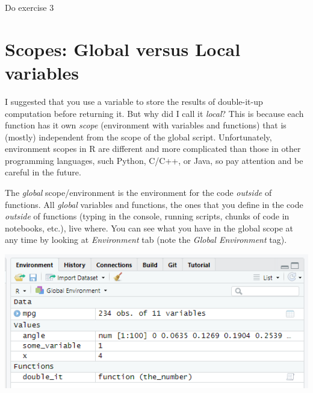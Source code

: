 \documentclass[
]{book}
\begin{document}
Do exercise 3

\hypertarget{scopes-global-versus-local-variables}{%
\section{Scopes: Global versus Local variables}\label{scopes-global-versus-local-variables}}

I suggested that you use a variable to store the results of double-it-up computation before returning it. But why did I call it \emph{local}? This is because each function has it own \emph{scope} (environment with variables and functions) that is (mostly) independent from the scope of the global script. Unfortunately, environment scopes in R are different and more complicated than those in other programming languages, such Python, C/C++, or Java, so pay attention and be careful in the future.

The \emph{global} scope/environment is the environment for the code \emph{outside} of functions. All \emph{global} variables and functions, the ones that you define in the code \emph{outside} of functions (typing in the console, running scripts, chunks of code in notebooks, etc.), live where. You can see what you have in the global scope at any time by looking at \emph{Environment} tab (note the \emph{Global Environment} tag).

\begin{center}\includegraphics[width=0.7\linewidth]{images/environment-tab} \end{center}
\end{document}
